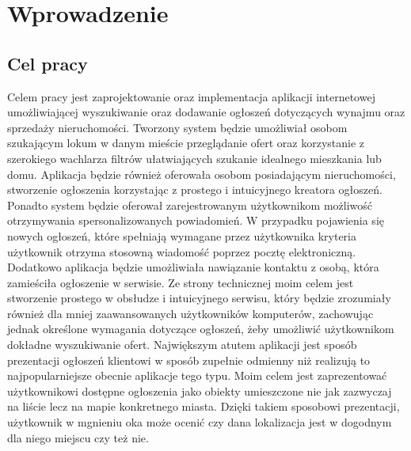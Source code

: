 \chapter{Wprowadzenie}
\label{cha:wprowadzenie}


\section{Cel pracy}
\label{sec:celPracy}
Celem pracy jest zaprojektowanie oraz implementacja aplikacji internetowej umożliwiającej wyszukiwanie oraz dodawanie ogłoszeń dotyczących wynajmu oraz sprzedaży nieruchomości. Tworzony system będzie umożliwiał osobom szukającym lokum w danym mieście przeglądanie ofert oraz korzystanie z szerokiego wachlarza filtrów ułatwiających szukanie idealnego mieszkania lub domu. Aplikacja będzie również oferowała osobom posiadającym nieruchomości, stworzenie ogłoszenia korzystając z prostego i intuicyjnego kreatora ogłoszeń. Ponadto system będzie oferował zarejestrowanym użytkownikom możliwość otrzymywania  spersonalizowanych powiadomień. W przypadku pojawienia się nowych ogłoszeń, które spełniają wymagane przez użytkownika kryteria użytkownik otrzyma stosowną wiadomość poprzez pocztę elektroniczną. Dodatkowo aplikacja będzie umożliwiała nawiązanie kontaktu z osobą, która zamieściła ogłoszenie w serwisie. Ze strony technicznej moim celem jest stworzenie prostego w obsłudze i intuicyjnego serwisu, który będzie zrozumiały również dla mniej zaawansowanych użytkowników komputerów, zachowując jednak określone wymagania dotyczące ogłoszeń, żeby umożliwić użytkownikom dokładne wyszukiwanie ofert. Największym atutem aplikacji jest sposób prezentacji ogłoszeń klientowi w sposób zupełnie odmienny niż realizują to najpopularniejsze obecnie aplikacje tego typu. Moim celem jest zaprezentować użytkownikowi dostępne ogłoszenia jako obiekty umieszczone nie jak zazwyczaj na liście lecz na mapie konkretnego miasta. Dzięki takiem sposobowi prezentacji, użytkownik w mgnieniu oka może ocenić czy dana lokalizacja jest w dogodnym dla niego miejscu czy też nie.



